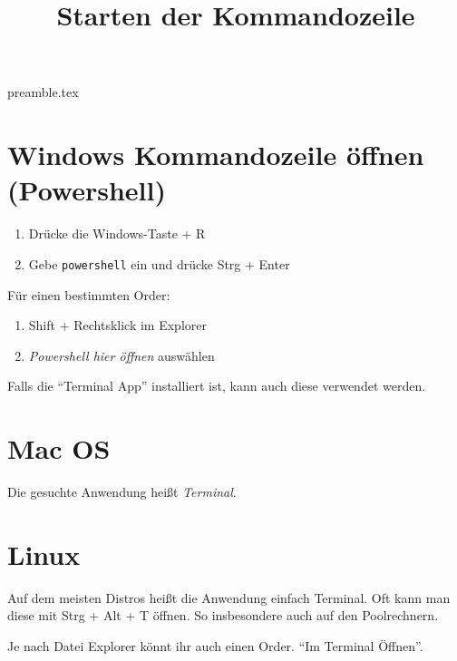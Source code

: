 \RequirePackage{import}
{preamble.tex}
\usepackage{hyperref}
\title{Starten der Kommandozeile}


\maketitle

\section*{Windows Kommandozeile öffnen (Powershell)}
\begin{enumerate}
    \item Drücke die Windows-Taste + R
    \item Gebe \texttt{powershell} ein und drücke Strg + Enter
\end{enumerate}
Für einen bestimmten Order:
\begin{enumerate}
    \item Shift + Rechtsklick im Explorer
    \item \emph{Powershell hier öffnen} auswählen
\end{enumerate}
\begin{hinweis}
    Falls die \enquote{Terminal App} installiert ist, kann auch diese verwendet werden.
\end{hinweis}

\section*{Mac OS}
Die gesuchte Anwendung heißt \emph{Terminal}.

\section*{Linux}
Auf dem meisten Distros heißt die Anwendung einfach Terminal.
Oft kann man diese mit Strg + Alt + T  öffnen.
So insbesondere auch auf den Poolrechnern.

Je nach Datei Explorer könnt ihr auch einen Order.
\enquote{Im Terminal Öffnen}.


